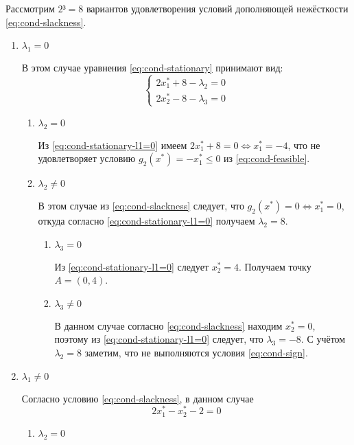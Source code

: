 Рассмотрим $2³=8$ вариантов удовлетворения условий дополняющей
нежёсткости \eqref{eq:cond-slackness}.

\begin{enumerate}
\renewcommand{\labelenumi}{\Roman{enumi})}
\renewcommand{\labelenumiii}{\arabic{enumiii})}

\item $\lambda_1 = 0$
  
  В этом случае уравнения \eqref{eq:cond-stationary} принимают вид:
  \begin{equation}
    \label{eq:cond-stationary-l1=0}
    \begin{cases}
      2x^*_1+8-\lambda_2=0\\
      2x^*_2-8-\lambda_3=0
    \end{cases}
  \end{equation}
  \begin{enumerate}
  \item $\lambda_2 = 0$

    Из \eqref{eq:cond-stationary-l1=0} имеем $2x^*_1+8=0 \iff
    x^*_1=-4$, что не удовлетворяет условию $g_2(x^*) = -x^*_1 \leq 0$
    из \eqref{eq:cond-feasible}.
  \item $\lambda_2 ≠ 0$
    
    В этом случае из \eqref{eq:cond-slackness} следует, что
    $g_2(x^*)=0 \iff x^*_1 = 0$, откуда согласно
    \eqref{eq:cond-stationary-l1=0} получаем $\lambda_2=8$.
    \begin{enumerate}
    \item $\lambda_3 = 0$
      
      Из \eqref{eq:cond-stationary-l1=0} следует $x^*_2=4$. Получаем
      точку $A = (0, 4)$.
    \item $\lambda_3 ≠ 0$

      В данном случае согласно \eqref{eq:cond-slackness} находим
      $x^*_2=0$, поэтому из \eqref{eq:cond-stationary-l1=0} следует, что
      $\lambda_3=-8$. С учётом $\lambda_2=8$ заметим, что не
      выполняются условия \eqref{eq:cond-sign}.
    \end{enumerate}
  \end{enumerate}
\item $\lambda_1 ≠ 0$ 

  Согласно условию \eqref{eq:cond-slackness}, в
  данном случае
  \begin{equation}
    \label{eq:cond-slackness-l1n=0}
    2x^*_1-x^*_2-2=0
  \end{equation}
  \begin{enumerate}
  \item $\lambda_2 = 0$


\end{enumerate}
\end{enumerate}
